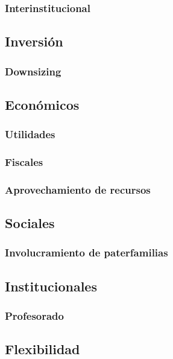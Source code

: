 \documentclass[draft,12pt,headsepline,footsepline,paper=letter]{scrreprt}
\begin{document}
\subsubsection{Interinstitucional}

\subsection{Inversión}

\subsubsection{Downsizing}

\subsection{Económicos}

\subsubsection{Utilidades}

\subsubsection{Fiscales}

\subsubsection{Aprovechamiento de recursos}

\subsection{Sociales}

\subsubsection{Involucramiento de paterfamilias}

\subsection{Institucionales}

\subsubsection{Profesorado}

\subsection{Flexibilidad}
\end{document}
